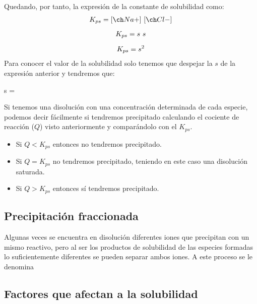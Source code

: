 Quedando, por tanto, la expresión de la constante de solubilidad como:
\begin{gather*}
    K_{ps} = \conc{Na+}\ \conc{Cl-}\separ
    K_{ps} = s\ s\separ
    K_{ps} = s^2
\end{gather*}
Para conocer el valor de la solubilidad solo tenemos que despejar la \(s\) de la expresión anterior y tendremos que:
\begin{centeredequation}
    s = 
\end{centeredequation}

Si tenemos una disolución con una concentración determinada de cada especie, podemos decir fácilmente si tendremos precipitado calculando el cociente de reacción (\(Q\)) visto anteriormente y comparándolo con el \(K_{ps}\).
\begin{itemize}
    \item Si \(Q < K_{ps}\) entonces no tendremos precipitado.
    \item Si \(Q = K_{ps}\) no tendremos precipitado, teniendo en este caso una disolución saturada.
    \item Si \(Q > K_{ps}\) entonces sí tendremos precipitado.
\end{itemize}

\subsection{Precipitación fraccionada}\label{subsec:precipitacion-fraccionada}

Algunas veces se encuentra en disolución diferentes iones que precipitan con un mismo reactivo, pero al ser los productos de solubilidad de las especies formadas lo suficientemente diferentes se pueden separar ambos iones.
A este proceso se le denomina 

\subsection{Factores que afectan a la solubilidad}\label{subsec:factores-que-afectan-a-la-solubilidad}

